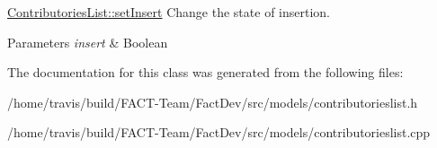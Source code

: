 \hyperlink{classModels_1_1ContributoriesList_a5d34942a45954d98e53112e2523bee9b}{Contributories\-List\-::set\-Insert} Change the state of insertion. 


\begin{DoxyParams}{Parameters}
{\em insert} & Boolean \\
\hline
\end{DoxyParams}


The documentation for this class was generated from the following files\-:\begin{DoxyCompactItemize}
\item 
/home/travis/build/\-F\-A\-C\-T-\/\-Team/\-Fact\-Dev/src/models/contributorieslist.\-h\item 
/home/travis/build/\-F\-A\-C\-T-\/\-Team/\-Fact\-Dev/src/models/contributorieslist.\-cpp\end{DoxyCompactItemize}
